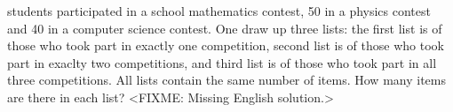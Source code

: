  students participated in a school mathematics contest,
50 in a physics contest and
40 in a computer science contest.
One draw up three lists:
the first list is of those who took part in exactly one competition,
second list is of those who took part in exaclty two competitions, and
third list is of those who took part in all three competitions.
All lists contain the same number of items.
How many items are there in each list?
\solution
<FIXME: Missing English solution.>
\endproblem
